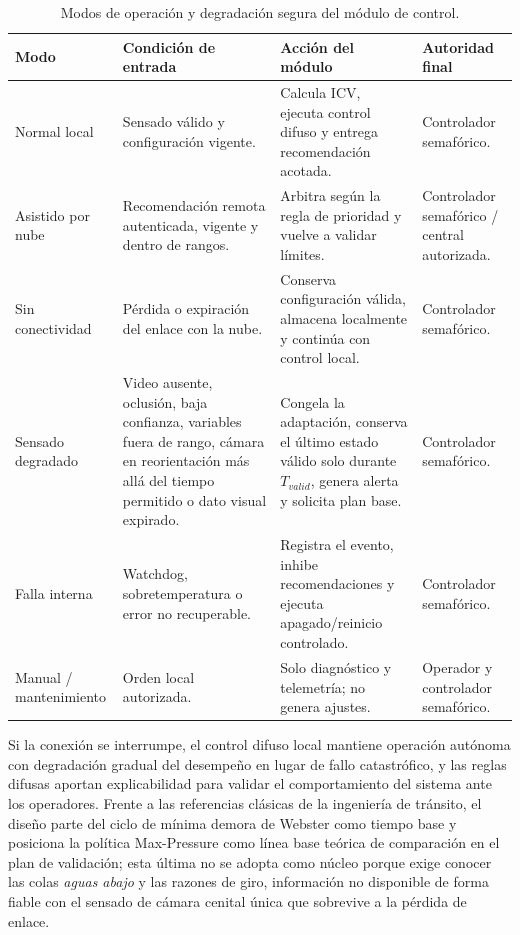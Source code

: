 \begin{table}[H]
  \centering
  \footnotesize
  \caption{Modos de operación y degradación segura del módulo de control.}
  \label{tab:modos-operacion}
  \begin{tabular}{@{}p{2.4cm}p{3.6cm}p{4.0cm}p{3.2cm}@{}}
    \toprule
    \textbf{Modo} & \textbf{Condición de entrada} & \textbf{Acción del módulo} & \textbf{Autoridad final}\\
    \midrule
    Normal local & Sensado válido y configuración vigente. & Calcula ICV, ejecuta control difuso y entrega recomendación acotada. & Controlador semafórico.\\
    Asistido por nube & Recomendación remota autenticada, vigente y dentro de rangos. & Arbitra según la regla de prioridad y vuelve a validar límites. & Controlador semafórico / central autorizada.\\
    Sin conectividad & Pérdida o expiración del enlace con la nube. & Conserva configuración válida, almacena localmente y continúa con control local. & Controlador semafórico.\\
    Sensado degradado & Video ausente, oclusión, baja confianza, variables fuera de rango, cámara en reorientación más allá del tiempo permitido o dato visual expirado. & Congela la adaptación, conserva el último estado válido solo durante $T_{valid}$, genera alerta y solicita plan base. & Controlador semafórico.\\
    Falla interna & Watchdog, sobretemperatura o error no recuperable. & Registra el evento, inhibe recomendaciones y ejecuta apagado/reinicio controlado. & Controlador semafórico.\\
    Manual / mantenimiento & Orden local autorizada. & Solo diagnóstico y telemetría; no genera ajustes. & Operador y controlador semafórico.\\
    \bottomrule
  \end{tabular}
\end{table}

Si la conexión se interrumpe, el control difuso local mantiene operación autónoma con
degradación gradual del desempeño en lugar de fallo catastrófico, y las reglas difusas aportan
explicabilidad para validar el comportamiento del sistema ante los operadores. Frente a las
referencias clásicas de la ingeniería de tránsito, el diseño parte del ciclo de mínima demora
de Webster como tiempo base y posiciona la política Max-Pressure como línea base teórica de
comparación en el plan de validación; esta última no se adopta como núcleo porque exige conocer
las colas \emph{aguas abajo} y las razones de giro, información no disponible de forma fiable
con el sensado de cámara cenital única que sobrevive a la pérdida de enlace.

